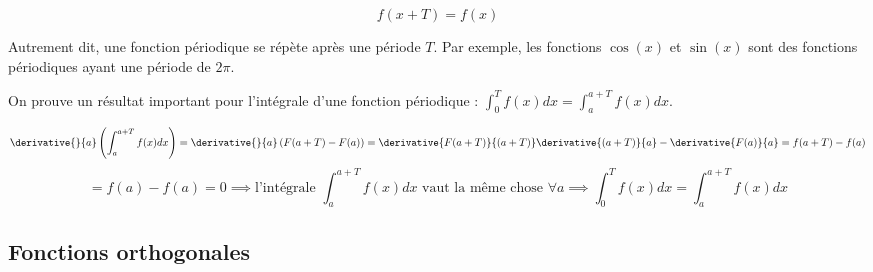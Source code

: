 \begin{equation}
    f(x + T) = f(x)
\end{equation}

Autrement dit, une fonction périodique se répète après une période $T$. Par exemple, les fonctions $\cos(x)$ et $\sin(x)$ sont des fonctions périodiques ayant une période de $2\pi$.

On prouve un résultat important pour l'intégrale d'une fonction périodique : $\int_{0}^{T}f(x)dx = \int_{a}^{a+T}f(x)dx$.

\begin{equation*}
    \derivative{}{a}\left(\int_{a}^{a+T}f(x)dx\right) = \derivative{}{a}\left(F(a+T) - F(a)\right) = \derivative{F(a+T)}{(a+T)} \derivative{(a+T)}{a} - \derivative{F(a)}{a} = f(a+T) - f(a)
\end{equation*}
\begin{equation*}
    = f(a) - f(a) = 0 \implies \text{l'intégrale } \int_{a}^{a+T}f(x)dx \text{ vaut la même chose } \forall a \implies \int_{0}^{T}f(x)dx = \int_{a}^{a+T}f(x)dx
\end{equation*}

\subsection{Fonctions orthogonales}